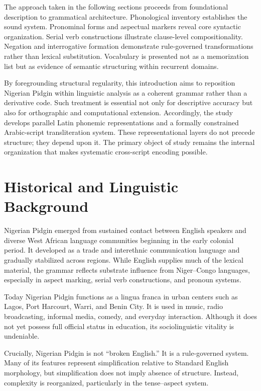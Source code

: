 \documentclass[12pt]{article}
\begin{document}
The approach taken in the following sections proceeds from foundational description to grammatical architecture. Phonological inventory establishes the sound system. Pronominal forms and aspectual markers reveal core syntactic organization. Serial verb constructions illustrate clause-level compositionality. Negation and interrogative formation demonstrate rule-governed transformations rather than lexical substitution. Vocabulary is presented not as a memorization list but as evidence of semantic structuring within recurrent domains.

By foregrounding structural regularity, this introduction aims to reposition Nigerian Pidgin within linguistic analysis as a coherent grammar rather than a derivative code. Such treatment is essential not only for descriptive accuracy but also for orthographic and computational extension. Accordingly, the study develops parallel Latin phonemic representations and a formally constrained Arabic-script transliteration system. These representational layers do not precede structure; they depend upon it. The primary object of study remains the internal organization that makes systematic cross-script encoding possible.

\section{Historical and Linguistic Background}

Nigerian Pidgin emerged from sustained contact between English speakers and diverse West African language communities beginning in the early colonial period. It developed as a trade and interethnic communication language and gradually stabilized across regions. While English supplies much of the lexical material, the grammar reflects substrate influence from Niger--Congo languages, especially in aspect marking, serial verb constructions, and pronoun systems.

Today Nigerian Pidgin functions as a lingua franca in urban centers such as Lagos, Port Harcourt, Warri, and Benin City. It is used in music, radio broadcasting, informal media, comedy, and everyday interaction. Although it does not yet possess full official status in education, its sociolinguistic vitality is undeniable.

Crucially, Nigerian Pidgin is not ``broken English.'' It is a rule-governed system. Many of its features represent simplification relative to Standard English morphology, but simplification does not imply absence of structure. Instead, complexity is reorganized, particularly in the tense--aspect system.
\end{document}
